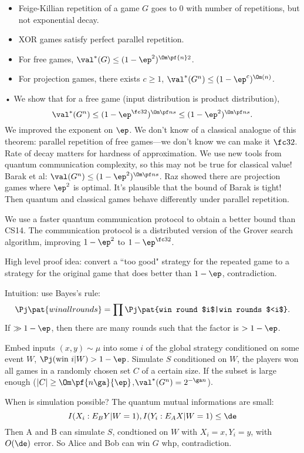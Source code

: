 \begin{itemize}
\item
Feige-Killian repetition of a game $G$ goes to 0 with number of repetitions, but not exponential decay.
\item
XOR games satisfy perfect parallel repetition.
\item
For free games, $\val^*(G)\le (1-\ep^2)^{\Om\pf{n}2}$.
\item
For projection games, there exists $c\ge 1$, $\val^*(G^n)\le (1-\ep^c)^{\Om(n)}$.
\end{itemize}•
We show that for a free game (input distribution is product distribution),
\[
\val^*(G^n)\le (1-\ep^{\fc 32})^{\Om\pf ns}\le (1-\ep^2)^{\Om\pf ns}.
\]
We improved the exponent on $\ep$.
We don't know of a classical analogue of this theorem: parallel repetition of free games---we don't know we can make it $\fc32$. 
Rate of decay matters for hardness of approximation.
We use new tools from quantum communication complexity, so this may not be true for classical value!
Barak et al: $\val(G^n)\le (1-\ep^2)^{\Om \pf ns}$. Raz showed there are projection games where $\ep^2$ is optimal. It's plausible that the bound of Barak is tight! Then quantum and classical games behave differently under parallel repetition.

We use a faster quantum communication protocol to obtain a better bound than CS14. The communication protocol is a distributed version of the Grover search algorithm, improving $1-\ep^2$ to $1-\ep^{\fc 32}$.

High level proof idea: convert a ``too good" strategy for the repeated game to a strategy for the original game that does better than $1-\ep$, contradiction.

Intuition: use Bayes's rule:
\[
\Pj\pat{win all rounds}=\prod \Pj\pat{win round $i$|win rounds $<i$}.
\]If $\gg1-\ep$, then there are many rounds such that the factor is $>1-\ep$.

Embed inputs $(x,y)\sim \mu$ into some $i$ of the global strategy conditioned on some event $W$, $\Pj(\text{win }i|W)>1-\ep$. Simulate $S$ conditioned on $W$, the players won all games in a randomly chosen set $C$ of a certain size. If the subset is large enough ($|C|\ge \Om\pf{n\ga}{\ep}$,$\val^*(G^n)=2^{-\ga n}$).

When is simulation possible? The quantum mutual informations are small:
\[
I(X_i:E_BY|W=1),I(Y_i:E_AX|W=1)\le \de
\]%
Then A and B can simulate $S$, condtioned on $W$ with $X_i=x,Y_i=y$, with $O(\de)$ error. So Alice and Bob can win $G$ whp, contradiction.

